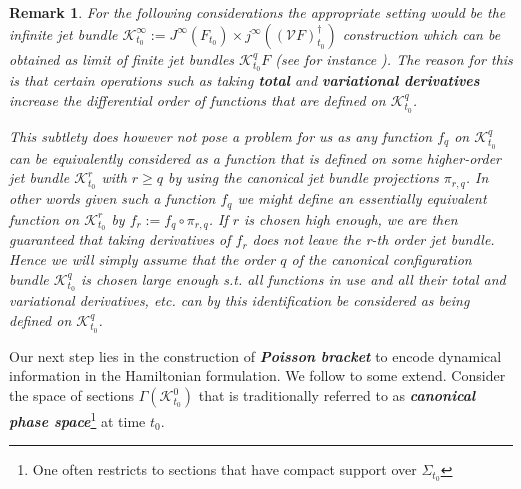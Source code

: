 \documentclass[a4paper,12pt, DIV=14, BCOR=5mm, twoside, headsepline, numbers=noenddot]{scrbook}
\newtheorem*{remark}{Remark}
\begin{document}
\begin{remark}
For the following considerations the appropriate setting would be the infinite jet bundle $\mathcal{K}^{\infty}_{t_0} := J^{\infty}(F_{t_0})\times j^{\infty}((\mathcal{V}F)_{t_0}^{\dagger})$ construction which can be obtained as limit of finite jet bundles $\mathcal{K}^q_{t_0}F$ (see for instance \cite{saunders_1989}). The reason for this is that certain operations such as taking \textit{\textbf{total}} and \textit{\textbf{variational derivatives}} increase the differential order of functions that are defined on $\mathcal{K}^{q}_{t_0}$.

This subtlety does however not pose a problem for us as any function $f_q$ on $\mathcal{K}^q_{t_0}$ can be equivalently considered as a function that is defined on some higher-order jet bundle $\mathcal{K}^r_{t_0}$ with $r\geq q$ by using the canonical jet bundle projections $\pi_{r,q}$. In other words given such a function $f_q$ we might define an essentially equivalent function on $\mathcal{K}^r_{t_0}$ by $f_r:=f_q \circ \pi_{r,q}$. If $r$ is chosen high enough, we are then guaranteed that taking derivatives of $f_r$ does not leave the r-th order jet bundle. Hence we will simply assume that the order $q$ of the canonical configuration bundle $\mathcal{K}^q_{t_0}$ is chosen large enough s.t. all functions in use and all their total and variational derivatives, etc. can by this identification be considered as being defined on $\mathcal{K}^q_{t_0}$. 
\end{remark}

Our next step lies in the construction of \textit{\textbf{Poisson bracket}} to encode dynamical information in the Hamiltonian formulation. 
We follow \cite{1997hep.th....9164B} to some extend. Consider the space of sections  $\Gamma(\mathcal{K}^0_{t_0})$ that is traditionally referred to as \textit{\textbf{canonical phase space}}\footnote{One often restricts to sections that have compact support over $\Sigma_{t_0}$} at time $t_0$. 
\end{document}
